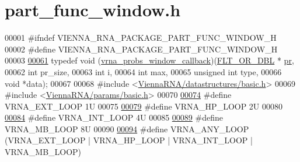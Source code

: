 \hypertarget{part__func__window_8h_source}{}\section{part\+\_\+func\+\_\+window.\+h}
\label{part__func__window_8h_source}

\begin{DoxyCode}
00001 \textcolor{preprocessor}{#ifndef VIENNA\_RNA\_PACKAGE\_PART\_FUNC\_WINDOW\_H}
00002 \textcolor{preprocessor}{#define VIENNA\_RNA\_PACKAGE\_PART\_FUNC\_WINDOW\_H}
00003 
\hyperlink{group__part__func__window_gabe710a1182e6db69cc75329dfc9bed67}{00061} \textcolor{keyword}{typedef} void (\hyperlink{group__part__func__window_gabe710a1182e6db69cc75329dfc9bed67}{vrna\_probs\_window\_callback})(\hyperlink{group__data__structures_ga31125aeace516926bf7f251f759b6126}{FLT\_OR\_DBL}    *
      \hyperlink{fold__vars_8h_ac98ec419070aee6831b44e5c700f090f}{pr},
00062                                           \textcolor{keywordtype}{int}           pr\_size,
00063                                           \textcolor{keywordtype}{int}           i,
00064                                           \textcolor{keywordtype}{int}           max,
00065                                           \textcolor{keywordtype}{unsigned} \textcolor{keywordtype}{int}  type,
00066                                           \textcolor{keywordtype}{void}          *data);
00067 
00068 \textcolor{preprocessor}{#include <\hyperlink{datastructures_2basic_8h}{ViennaRNA/datastructures/basic.h}>}
00069 \textcolor{preprocessor}{#include <\hyperlink{params_2basic_8h}{ViennaRNA/params/basic.h}>}
00070 
\hyperlink{group__part__func__window_gaf0bb577130090f6c856d1358804250bf}{00074} \textcolor{preprocessor}{#define VRNA\_EXT\_LOOP   1U}
00075 
\hyperlink{group__part__func__window_ga30170811c320f3a7b23ffff3b3343b91}{00079} \textcolor{preprocessor}{#define VRNA\_HP\_LOOP    2U}
00080 
\hyperlink{group__part__func__window_ga956a237e7d956b684b7d593cb3eca665}{00084} \textcolor{preprocessor}{#define VRNA\_INT\_LOOP   4U}
00085 
\hyperlink{group__part__func__window_gad905b71f02b3799eb84b490435aec837}{00089} \textcolor{preprocessor}{#define VRNA\_MB\_LOOP    8U}
00090 
\hyperlink{group__part__func__window_ga1fef1ad234755db78ab6b695edce5080}{00094} \textcolor{preprocessor}{#define VRNA\_ANY\_LOOP   (VRNA\_EXT\_LOOP | VRNA\_HP\_LOOP | VRNA\_INT\_LOOP | VRNA\_MB\_LOOP)}

\end{DoxyCode}
